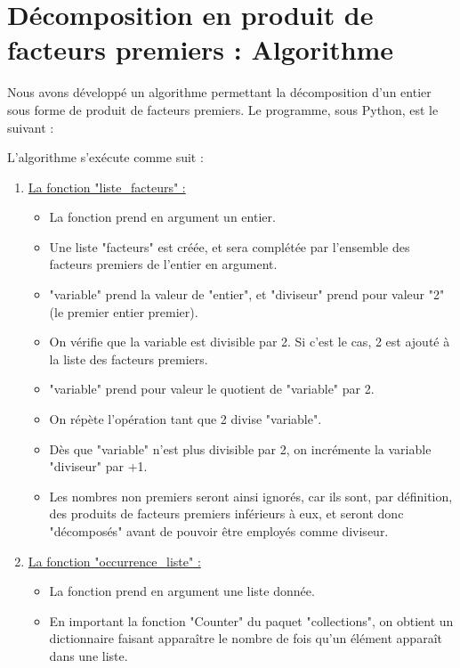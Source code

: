 \documentclass[titlepage]{article}
\begin{document}
\section{Décomposition en produit de facteurs premiers : Algorithme}

Nous avons développé un algorithme permettant la décomposition d'un entier sous forme de produit de facteurs premiers. Le programme, sous Python, est le suivant :
\medskip



\medskip \par L'algorithme s'exécute comme suit :

\begin{enumerate}
\item \underline{La fonction "liste\_facteurs" :}
\medskip
 
	\begin{itemize}
 	\item La fonction prend en argument un entier.
 	\item Une liste "facteurs" est créée, et sera complétée par l'ensemble des facteurs premiers de l'entier en argument.
 	\item "variable" prend la valeur de "entier", et "diviseur" prend pour valeur "2" (le premier entier premier).
 	\item On vérifie que la variable est divisible par 2. Si c'est le cas, 2 est ajouté à la liste des facteurs premiers.
 	\item "variable" prend pour valeur le quotient de "variable" par 2.
 	\item On répète l'opération tant que 2 divise "variable".
 	\item Dès que "variable" n'est plus divisible par 2, on incrémente la variable "diviseur" par +1. 
 	\item Les nombres non premiers seront ainsi ignorés, car ils sont, par définition, des produits de facteurs premiers inférieurs à eux, et seront donc "décomposés" avant de pouvoir être employés comme diviseur.
 \end{itemize}
 
\medskip
\item \underline{La fonction "occurrence\_liste" :}
\medskip

	\begin{itemize}
	\item La fonction prend en argument une liste donnée.
	\item En important la fonction "Counter" du paquet "collections", on obtient un dictionnaire faisant apparaître le nombre de fois qu'un élément apparaît dans une liste.
	\end{itemize}


\end{enumerate}
\end{document}
